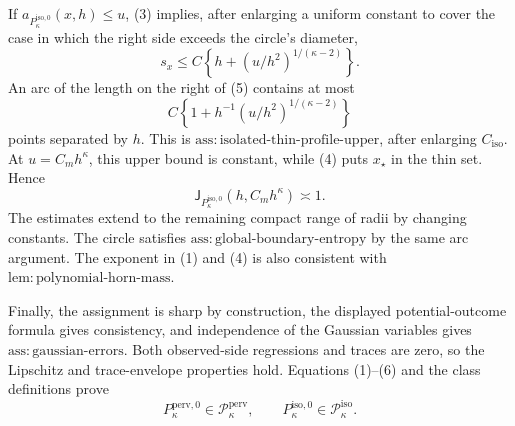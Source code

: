 If \(a_{P_{\kappa}^{\mathrm{iso},0}}(x,h)\le u\), (3) implies, after enlarging a uniform constant to cover the case in which the right side exceeds the circle's diameter,
\[
 s_x\le C\left\{h+(u/h^2)^{1/(\kappa-2)}\right\}. \tag{5}
\]
An arc of the length on the right of (5) contains at most
\[
 C\left\{1+h^{-1}(u/h^2)^{1/(\kappa-2)}\right\}
\]
points separated by \(h\). This is \(\mathrm{ass:isolated\text{-}thin\text{-}profile\text{-}upper}\), after enlarging \(C_{\mathrm{iso}}\). At \(u=C_mh^{\kappa}\), this upper bound is constant, while (4) puts \(x_{\star}\) in the thin set. Hence
\[
 \mathsf J_{P_{\kappa}^{\mathrm{iso},0}}(h,C_mh^{\kappa})\asymp1. \tag{6}
\]
The estimates extend to the remaining compact range of radii by changing constants. The circle satisfies \(\mathrm{ass:global\text{-}boundary\text{-}entropy}\) by the same arc argument. The exponent in (1) and (4) is also consistent with \(\mathrm{lem:polynomial\text{-}horn\text{-}mass}\).

Finally, the assignment is sharp by construction, the displayed potential-outcome formula gives consistency, and independence of the Gaussian variables gives \(\mathrm{ass:gaussian\text{-}errors}\). Both observed-side regressions and traces are zero, so the Lipschitz and trace-envelope properties hold. Equations (1)--(6) and the class definitions prove
\[
 P_{\kappa}^{\mathrm{perv},0}\in\mathcal P_{\kappa}^{\mathrm{perv}},
 \qquad
 P_{\kappa}^{\mathrm{iso},0}\in\mathcal P_{\kappa}^{\mathrm{iso}}.
\]